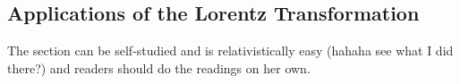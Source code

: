 \subsection{Applications of the Lorentz Transformation}

The section can be self-studied and is relativistically easy (hahaha see what I did there?) and readers should do the readings on her own.
